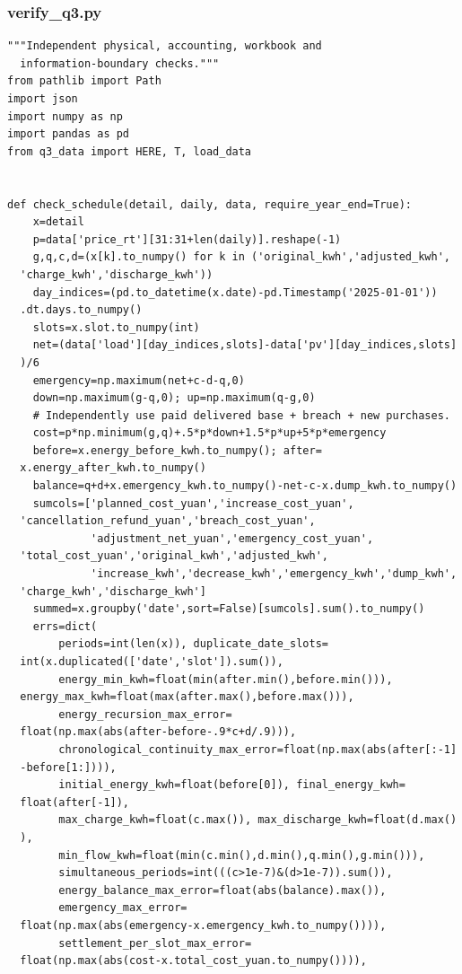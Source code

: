 \subsubsection*{verify\_q3.py}
\begin{verbatim}
"""Independent physical, accounting, workbook and
  information-boundary checks."""
from pathlib import Path
import json
import numpy as np
import pandas as pd
from q3_data import HERE, T, load_data


def check_schedule(detail, daily, data, require_year_end=True):
    x=detail
    p=data['price_rt'][31:31+len(daily)].reshape(-1)
    g,q,c,d=(x[k].to_numpy() for k in ('original_kwh','adjusted_kwh',
  'charge_kwh','discharge_kwh'))
    day_indices=(pd.to_datetime(x.date)-pd.Timestamp('2025-01-01'))
  .dt.days.to_numpy()
    slots=x.slot.to_numpy(int)
    net=(data['load'][day_indices,slots]-data['pv'][day_indices,slots]
  )/6
    emergency=np.maximum(net+c-d-q,0)
    down=np.maximum(g-q,0); up=np.maximum(q-g,0)
    # Independently use paid delivered base + breach + new purchases.
    cost=p*np.minimum(g,q)+.5*p*down+1.5*p*up+5*p*emergency
    before=x.energy_before_kwh.to_numpy(); after=
  x.energy_after_kwh.to_numpy()
    balance=q+d+x.emergency_kwh.to_numpy()-net-c-x.dump_kwh.to_numpy()
    sumcols=['planned_cost_yuan','increase_cost_yuan',
  'cancellation_refund_yuan','breach_cost_yuan',
             'adjustment_net_yuan','emergency_cost_yuan',
  'total_cost_yuan','original_kwh','adjusted_kwh',
             'increase_kwh','decrease_kwh','emergency_kwh','dump_kwh',
  'charge_kwh','discharge_kwh']
    summed=x.groupby('date',sort=False)[sumcols].sum().to_numpy()
    errs=dict(
        periods=int(len(x)), duplicate_date_slots=
  int(x.duplicated(['date','slot']).sum()),
        energy_min_kwh=float(min(after.min(),before.min())),
  energy_max_kwh=float(max(after.max(),before.max())),
        energy_recursion_max_error=
  float(np.max(abs(after-before-.9*c+d/.9))),
        chronological_continuity_max_error=float(np.max(abs(after[:-1]
  -before[1:]))),
        initial_energy_kwh=float(before[0]), final_energy_kwh=
  float(after[-1]),
        max_charge_kwh=float(c.max()), max_discharge_kwh=float(d.max()
  ),
        min_flow_kwh=float(min(c.min(),d.min(),q.min(),g.min())),
        simultaneous_periods=int(((c>1e-7)&(d>1e-7)).sum()),
        energy_balance_max_error=float(abs(balance).max()),
        emergency_max_error=
  float(np.max(abs(emergency-x.emergency_kwh.to_numpy()))),
        settlement_per_slot_max_error=
  float(np.max(abs(cost-x.total_cost_yuan.to_numpy()))),

\end{verbatim}
